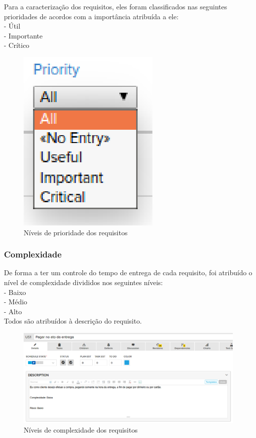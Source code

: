 Para a caracterização dos requisitos, eles foram classificados nas seguintes prioridades de acordos com a importância atribuída a ele:\\
\tab - Útil\\
\tab - Importante\\
\tab - Crítico\\

\begin{figure}[h]
    \centering
    \label{fig01}
        \includegraphics[keepaspectratio=true,scale=1]{figuras/RallyDev/prioridade.eps}
    \caption{Níveis de prioridade dos requisitos}
\end{figure}

\subsubsection{Complexidade}

De forma a ter um controle do tempo de entrega de cada requisito, foi atribuído o nível de complexidade divididos nos seguintes níveis:\\
\tab - Baixo\\
\tab - Médio\\
\tab - Alto\\
Todos são atribuídos à descrição do requisito.\\


\begin{figure}[h]
    \centering
    \label{fig01}
        \includegraphics[keepaspectratio=true,scale=0.4]{figuras/RallyDev/risco.eps}
    \caption{Níveis de complexidade dos requisitos}
\end{figure}


